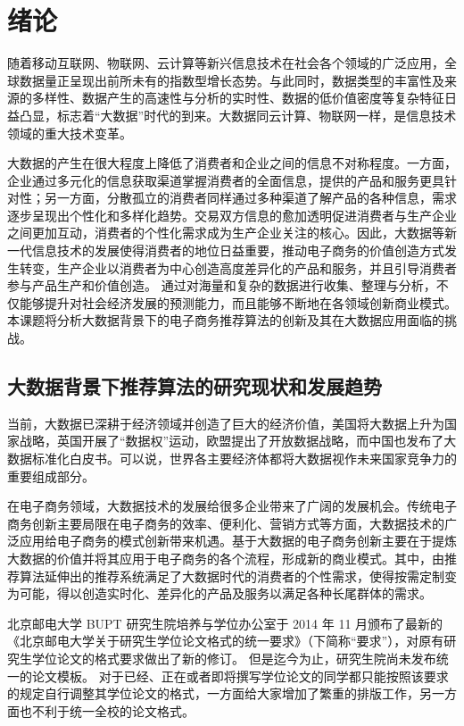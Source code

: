 
\chapter{绪论}
随着移动互联网、物联网、云计算等新兴信息技术在社会各个领域的广泛应用，全球数据量正呈现出前所未有的指数型增长态势。与此同时，数据类型的丰富性及来源的多样性、数据产生的高速性与分析的实时性、数据的低价值密度等复杂特征日益凸显，标志着“大数据”时代的到来。大数据同云计算、物联网一样，是信息技术领域的重大技术变革。

大数据的产生在很大程度上降低了消费者和企业之间的信息不对称程度。一方面，企业通过多元化的信息获取渠道掌握消费者的全面信息，提供的产品和服务更具针对性；另一方面，分散孤立的消费者同样通过多种渠道了解产品的各种信息，需求逐步呈现出个性化和多样化趋势。交易双方信息的愈加透明促进消费者与生产企业之间更加互动，消费者的个性化需求成为生产企业关注的核心。因此，大数据等新一代信息技术的发展使得消费者的地位日益重要，推动电子商务的价值创造方式发生转变，生产企业以消费者为中心创造高度差异化的产品和服务，并且引导消费者参与产品生产和价值创造。
通过对海量和复杂的数据进行收集、整理与分析，不仅能够提升对社会经济发展的预测能力，而且能够不断地在各领域创新商业模式。本课题将分析大数据背景下的电子商务推荐算法的创新及其在大数据应用面临的挑战。


\section{大数据背景下推荐算法的研究现状和发展趋势}
当前，大数据已深耕于经济领域并创造了巨大的经济价值，美国将大数据上升为国家战略，英国开展了“数据权”运动，欧盟提出了开放数据战略，而中国也发布了大数据标准化白皮书。可以说，世界各主要经济体都将大数据视作未来国家竞争力的重要组成部分。

在电子商务领域，大数据技术的发展给很多企业带来了广阔的发展机会。传统电子商务创新主要局限在电子商务的效率、便利化、营销方式等方面，大数据技术的广泛应用给电子商务的模式创新带来机遇。基于大数据的电子商务创新主要在于提炼大数据的价值并将其应用于电子商务的各个流程，形成新的商业模式\cite{大数据背景下电子商务的价值创造与模式创新}。其中，由推荐算法延伸出的推荐系统满足了大数据时代的消费者的个性需求，使得按需定制变为可能，得以创造实时化、差异化的产品及服务以满足各种长尾群体的需求。

北京邮电大学 \gls*{BUPT} 研究生院培养与学位办公室于 2014 年 11 月颁布了最新的《北京邮电大学关于研究生学位论文格式的统一要求》（下简称“要求”）\cite{BUPT_Thesis_Format_2014}，对原有研究生学位论文的格式要求做出了新的修订。
但是迄今为止，研究生院尚未发布统一的论文模板。
对于已经、正在或者即将撰写学位论文的同学都只能按照该要求的规定自行调整其学位论文的格式，一方面给大家增加了繁重的排版工作，另一方面也不利于统一全校的论文格式。


